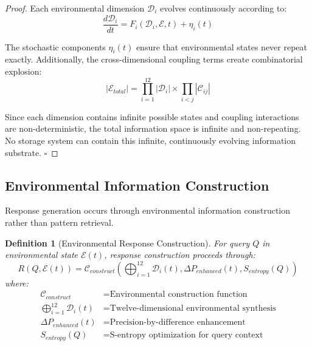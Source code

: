 \documentclass[12pt,a4paper]{article}
\newtheorem{definition}{Definition}
\begin{document}
\begin{proof}
Each environmental dimension $\mathcal{D}_i$ evolves continuously according to:
\begin{equation}
\frac{d\mathcal{D}_i}{dt} = F_i(\mathcal{D}_i, \mathcal{E}, t) + \eta_i(t)
\end{equation}

The stochastic components $\eta_i(t)$ ensure that environmental states never repeat exactly. Additionally, the cross-dimensional coupling terms create combinatorial explosion:
\begin{equation}
|\mathcal{E}_{total}| = \prod_{i=1}^{12} |\mathcal{D}_i| \times \prod_{i<j} |\mathcal{C}_{ij}|
\end{equation}

Since each dimension contains infinite possible states and coupling interactions are non-deterministic, the total information space is infinite and non-repeating. No storage system can contain this infinite, continuously evolving information substrate. $\square$
\end{proof}

\subsection{Environmental Information Construction}

Response generation occurs through environmental information construction rather than pattern retrieval.

\begin{definition}[Environmental Response Construction]
For query $Q$ in environmental state $\mathcal{E}(t)$, response construction proceeds through:
\begin{equation}
R(Q, \mathcal{E}(t)) = \mathcal{C}_{construct}\left(\bigoplus_{i=1}^{12} \mathcal{D}_i(t), \Delta P_{enhanced}(t), S_{entropy}(Q)\right)
\end{equation}
where:
\begin{align}
\mathcal{C}_{construct} &= \text{Environmental construction function} \\
\bigoplus_{i=1}^{12} \mathcal{D}_i(t) &= \text{Twelve-dimensional environmental synthesis} \\
\Delta P_{enhanced}(t) &= \text{Precision-by-difference enhancement} \\
S_{entropy}(Q) &= \text{S-entropy optimization for query context}
\end{align}
\end{definition}
\end{document}
